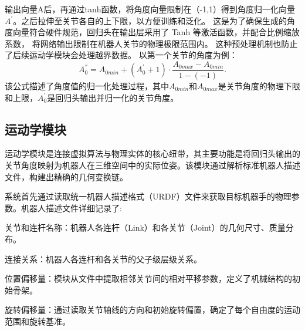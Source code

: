 输出向量A后，再通过tanh函数，将角度向量限制在（-1,1）得到角度归一化向量$A^{'}$。之后拉伸至关节各自的上下限，以方便训练和泛化。
这是为了确保生成的角度向量符合硬件规范，回归头在输出层采用了 Tanh 等激活函数，并配合比例缩放系数，
将网络输出限制在机器人关节的物理极限范围内。
这种预处理机制也防止了后续运动学模块会处理越界数据。
以第一个关节的角度为例：
\begin{equation}
A_0^{''} = A_{0min} + (A_0^{'} + 1) \cdot \frac{A_{0max} - A_{0min}}{1 - (-1)}.
\end{equation}
该公式描述了角度值的归一化处理过程，其中$A_{0min}$和$A_{0max}$是关节角度的物理下限和上限，$A_0^{'}$是回归头输出并归一化的关节角度。
\subsection{运动学模块}
运动学模块是连接虚拟算法与物理实体的核心纽带，其主要功能是将回归头输出的关节角度映射为机器人在三维空间中的实际位姿。该模块通过解析标准机器人描述文件，构建出精确的几何变换链。

系统首先通过读取统一机器人描述格式（URDF）文件来获取目标机器手的物理参数。机器人描述文件详细记录了:

关节和连杆名称：机器人各连杆（Link）和各关节（Joint）的几何尺寸、质量分布。

连接关系：机器人各连杆和各关节的父子级层级关系。

位置偏移量：模块从文件中提取相邻关节间的相对平移参数，定义了机械结构的初始骨架。

旋转偏移量：通过读取关节轴线的方向和初始旋转偏置，确定了每个自由度的运动范围和旋转基准。

